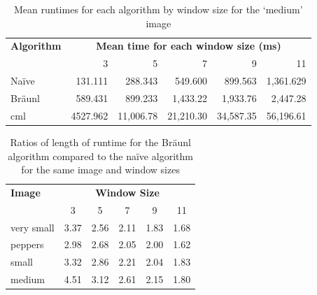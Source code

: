 \begin{table}
\centering
\caption[Mean runtimes for each algorithm for the `medium' image]{Mean runtimes for each algorithm by window size for the `medium' image}
\label{tab:median:medium}
\begin{tabular}{@{}lrrrrr@{}}
\toprule
\multicolumn{1}{c}{\textbf{Algorithm}} & \multicolumn{5}{c}{\textbf{Mean time for each window size (ms)}}      \\
\multicolumn{1}{r}{}                   & \multicolumn{1}{r}{3} & 5         & 7         & 9         & 11        \\ \midrule
Naïve                                  & 131.111               & 288.343   & 549.600   & 899.563   & 1,361.629 \\
Bräunl                                 & 589.431
               & 899.233   & 1,433.22  & 1,933.76  & 2,447.28  \\
\gls{cml}                                    & 4527.962
               & 11,006.78 & 21,210.30 & 34,587.35 & 56,196.61 \\ \bottomrule
\end{tabular}
\end{table}

\begin{table}
\centering
\begin{tabular}{@{}lccccc@{}}
\toprule
\textbf{Image} & \multicolumn{5}{c}{\textbf{Window Size}} \\
               & 3      & 5      & 7      & 9     & 11    \\ \midrule
very small     & 3.37   & 2.56   & 2.11   & 1.83  & 1.68  \\
peppers        & 2.98   & 2.68   & 2.05   & 2.00     & 1.62  \\
small          & 3.32   & 2.86   & 2.21   & 2.04  & 1.83  \\
medium         & 4.51   & 3.12   & 2.61   & 2.15  & 1.80   \\ \bottomrule
\end{tabular}
\caption[Ratios runtime for the Bräunl algorithm vs the naïve algorithm]{Ratios of length of runtime for the Bräunl algorithm compared to the naïve algorithm for the same image and window sizes}
\label{tab:median:ratbraun}
\end{table}

